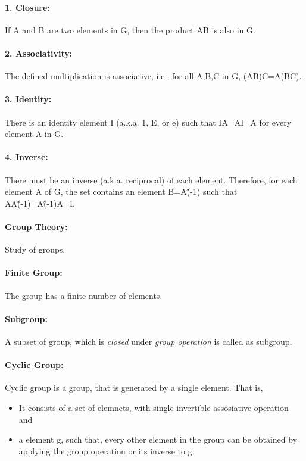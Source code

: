 \documentclass[12pt]{article}
\begin{document}
\paragraph{1. Closure:} If A and B are two elements in G, then the product AB is also in G.

\paragraph{2. Associativity:} The defined multiplication is associative, i.e., for all A,B,C in G, (AB)C=A(BC).

\paragraph{3. Identity:} There is an identity element I (a.k.a. 1, E, or e) such that IA=AI=A for every element A in G.

\paragraph{4. Inverse:} There must be an inverse (a.k.a. reciprocal) of each element. Therefore, for each element A of G, the set contains an element B=A\^(-1) such that AA\^(-1)=A\^(-1)A=I.

\paragraph{Group Theory:} Study of groups.

\paragraph{Finite Group:} The group has a finite number of elements.

\paragraph{Subgroup:} A subset of group, which is \textit{closed} under \textit{group operation} is called as subgroup.

\paragraph{Cyclic Group:} Cyclic group is a group, that is generated by a single element. That is,
\begin{itemize}
\item It consists of a set of elemnets, with single invertible assosiative operation and
\item a element g, such that, every other element in the group can be obtained by applying the group operation or its inverse to g.
\end{itemize}
\end{document}
